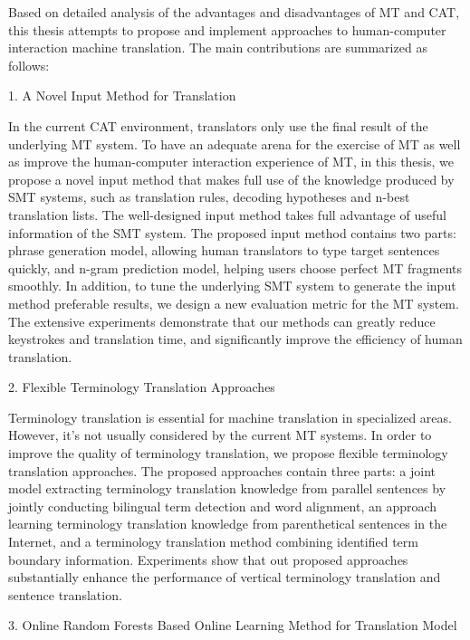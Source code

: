 Based on detailed analysis of the advantages and disadvantages of MT and CAT, this thesis attempts to propose and implement approaches to human-computer interaction machine translation. The main contributions are summarized as follows:

1. A Novel Input Method for Translation

In the current CAT environment, translators only use the final result of the underlying MT system. To have an adequate arena for the exercise of MT as well as improve the human-computer interaction experience of MT, in this thesis, we propose a novel input method that makes full use of the knowledge produced by SMT systems, such as translation rules, decoding hypotheses and n-best translation lists. The well-designed input method takes full advantage of useful information of the SMT system. The proposed input method contains two parts: phrase generation model, allowing human translators to type target sentences quickly, and n-gram prediction model, helping users choose perfect MT fragments smoothly. In addition, to tune the underlying SMT system to generate the input method preferable results, we design a new evaluation metric for the MT system. The extensive experiments demonstrate that our methods can greatly reduce keystrokes and translation time, and significantly improve the efficiency of human translation.

2. Flexible Terminology Translation Approaches

Terminology translation is essential for machine translation in specialized areas. However, it’s not usually considered by the current MT systems. In order to improve the quality of terminology translation, we propose flexible terminology translation approaches. The proposed approaches contain three parts: a joint model extracting terminology translation knowledge from parallel sentences by jointly conducting bilingual term detection and word alignment, an approach learning terminology translation knowledge from parenthetical sentences in the Internet, and a terminology translation method combining identified term boundary information. Experiments show that out proposed approaches substantially enhance the performance of vertical terminology translation and sentence translation.

3. Online Random Forests Based Online Learning Method for Translation Model

